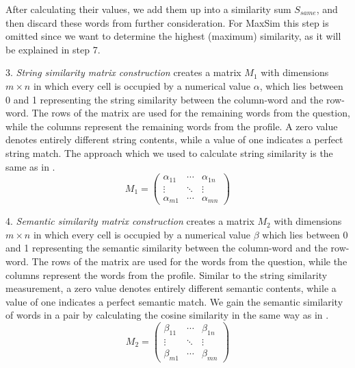 \documentclass[conference]{IEEEtran}
\begin{document}
After calculating their values, we add them up into a similarity sum $S_{same}$, and then discard these words from further consideration. For MaxSim this step is omitted since we want to determine the highest (maximum) similarity, as it will be explained in step 7.

3. {\it String similarity matrix construction} creates a matrix $M_1$ with dimensions $m\times n$ in which every cell is occupied by a numerical value $\alpha$, which lies between 0 and 1 representing the string similarity between the column-word and the row-word. The rows of the matrix are used for the remaining words from the question, while the columns represent the remaining words from the profile. A zero value denotes entirely different string contents, while a value of one indicates a perfect string match. The approach which we used to calculate string similarity is the same as in \cite{bib:LinSTSS}.
\begin{equation}
	\label{eq:m1}
	M_1 = 
\left( 
	\begin{array}{ccc}
		\alpha_{11} & \cdots & \alpha_{1n} \\
		\vdots & \ddots & \vdots \\
		\alpha_{m1} & \cdots & \alpha_{mn} 
	\end{array} 
\right)
\end{equation}

4. {\it Semantic similarity matrix construction} creates a matrix $M_2$ with dimensions $m\times n$ in which every cell is occupied by a numerical value $\beta$ which lies between 0 and 1 representing the semantic similarity between the column-word and the row-word. The rows of the matrix are used for the words from the question, while the columns represent the words from the profile. Similar to the string similarity measurement, a zero value denotes entirely different semantic contents, while a value of one indicates a perfect semantic match. We gain the semantic similarity of words in a pair by calculating the cosine similarity in the same way as in \cite{bib:LinSTSS}.
\begin{equation}
	\label{eq:m2}
	M_2 = 
\left( 
	\begin{array}{ccc}
		\beta_{11} & \cdots & \beta_{1n} \\
		\vdots & \ddots & \vdots \\
		\beta_{m1} & \cdots & \beta_{mn} 
	\end{array} 
\right)
\end{equation}
\end{document}
